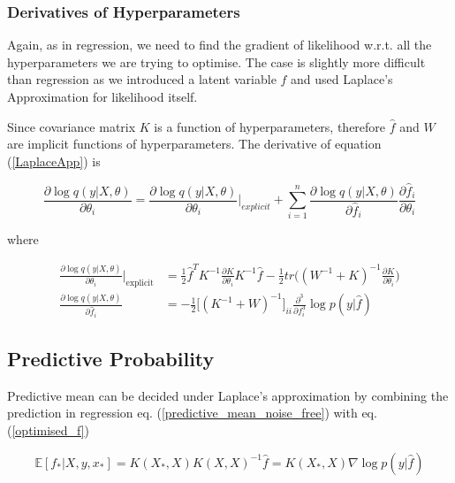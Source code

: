 \documentclass[14pt]{report}
\numberwithin{equation}{chapter}
\begin{document}
\begin{spacing}{2}
\subsubsection{Derivatives of Hyperparameters}

Again, as in regression, we need to find the gradient of likelihood w.r.t. all the hyperparameters we are trying to optimise. The case is slightly more difficult than regression as we introduced a latent variable $f$ and used Laplace's Approximation for likelihood itself. 

Since covariance matrix $K$ is a function of hyperparameters, therefore $\hat{f}$ and $W$ are implicit functions of hyperparameters. The derivative of equation (\ref{LaplaceApp}) is


\begin{equation}
\frac{\partial \operatorname{log}q(y|X,\theta)}{\partial \theta_i} = \frac{\partial \operatorname{log}q(y|X,\theta)}{\partial \theta_i}\bigg|_{explicit} + \sum_{i=1}^n \frac{\partial \operatorname{log}q(y|X,\theta)}{\partial \hat{f}_i}\frac{\partial \hat{f}_i}{\partial \theta_i}
\end{equation}

where


\begin{align} 
\label{eq:al1}
\frac{\partial \operatorname{log}q(y|X,\theta)}{\partial \theta_i}\bigg|_{\operatorname{explicit}} &= \frac{1}{2}\hat{f}^T K^{-1}\frac{\partial K}{\partial \theta_i}K^{-1}\hat{f} - \frac{1}{2}tr\Big((W^{-1}+K)^{-1}\frac{\partial K}{\partial \theta_i}\Big) \\ 
\label{eq:al2}
\frac{\partial \operatorname{log}q(y|X,\theta)}{\partial \hat{f}_i} &= -\frac{1}{2} \big[(K^{-1}+W)^{-1}\big]_{ii}\frac{\partial^3}{\partial f_i^3}\operatorname{log}p(y|\hat{f})
\end{align}



\subsection{Predictive Probability}
Predictive mean can be decided under Laplace's approximation by combining the prediction in regression eq. (\ref{predictive_mean_noise_free}) with eq. (\ref{optimised_f})

\begin{equation}
\label{predictive_mean_classification}
\mathbb{E}[f_\ast|X,y,x_\ast] = K(X_\ast, X)K(X, X)^{-1}\hat{f} = K(X_\ast, X) \nabla\operatorname{log}p(y|\hat{f}) 
\end{equation}


\end{spacing}
\end{document}

